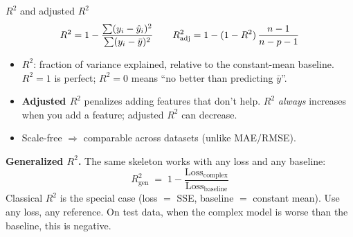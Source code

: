 \documentclass[aspectratio=169]{beamer}
\begin{document}
\begin{frame}{$R^2$ and adjusted $R^2$}
  \[
    R^2 = 1 - \frac{\sum (y_i - \hat{y}_i)^2}{\sum (y_i - \bar{y})^2}
    \qquad
    R^2_\text{adj} = 1 - (1 - R^2)\, \frac{n-1}{n-p-1}
  \]
  \vfill
  \begin{itemize}\small
    \item \textbf{$R^2$}: fraction of variance explained, relative to the constant-mean baseline. $R^2 = 1$ is perfect; $R^2 = 0$ means ``no better than predicting $\bar{y}$''.
    \item \textbf{Adjusted $R^2$} penalizes adding features that don't help. $R^2$ \emph{always} increases when you add a feature; adjusted $R^2$ can decrease.
    \item Scale-free $\Rightarrow$ comparable across datasets (unlike MAE/RMSE).
  \end{itemize}
  \vfill
  \textbf{Generalized $R^2$.} The same skeleton works with any loss and any baseline:
  \[
    R^2_\text{gen} \;=\; 1 - \frac{\text{Loss}_\text{complex}}{\text{Loss}_\text{baseline}}
  \]
  Classical $R^2$ is the special case (loss $=$ SSE, baseline $=$ constant mean). Use any loss, any reference. On test data, when the complex model is worse than the baseline, this is negative.
  \vfill
\end{frame}
\end{document}
